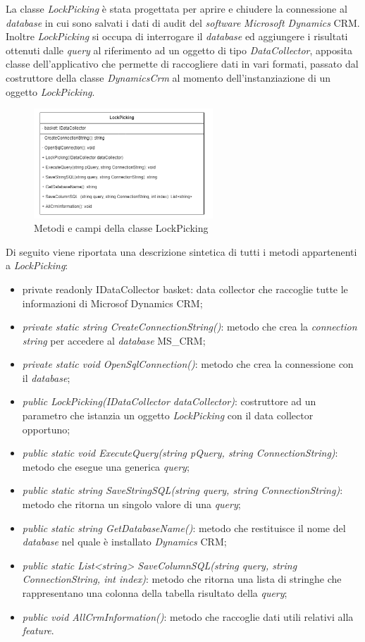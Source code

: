 La classe \emph{LockPicking} è stata progettata per aprire e chiudere la connessione al \emph{database} in cui sono salvati i dati di audit del \emph{software} \emph{Microsoft Dynamics} CRM.
Inoltre \emph{LockPicking} si occupa di interrogare il \emph{database} ed aggiungere i risultati ottenuti dalle \emph{query} al riferimento ad un oggetto di tipo \emph{DataCollector}, apposita classe dell'applicativo che permette di raccogliere dati in vari formati, passato dal costruttore della classe \emph{DynamicsCrm} al momento dell'instanziazione di un oggetto \emph{LockPicking}.
\begin{figure}[H]
\centering
\captionsetup{justification=centering,margin=2cm}
\includegraphics[width=0.6\textwidth ]{figures/lockpicking.png}
\caption [Metodi e campi della classe LockPicking]{Metodi e campi della classe LockPicking \label{fig:lockpicking}}
\end{figure}
Di seguito viene riportata una descrizione sintetica di tutti i metodi appartenenti a \emph{LockPicking}:
\begin{itemize}
    \item private readonly IDataCollector basket: data collector che raccoglie tutte le informazioni di Microsof Dynamics CRM;
    \item \textit{private static string CreateConnectionString()}: metodo che crea la \emph{connection string} per accedere al \emph{database} MS\_CRM;
    \item \textit{private static void OpenSqlConnection()}: metodo che crea la connessione con il \emph{database};
    \item \textit{public LockPicking(IDataCollector dataCollector)}: costruttore ad un parametro che istanzia un oggetto \emph{LockPicking} con il data collector opportuno;
    \item \textit{public static void ExecuteQuery(string pQuery, string ConnectionString)}: metodo che esegue una generica \emph{query};
    \item \textit{public static string SaveStringSQL(string query, string ConnectionString)}: metodo che ritorna un singolo valore di una \emph{query};
    \item \textit{public static string GetDatabaseName()}: metodo che restituisce il nome del \emph{database} nel quale è installato \emph{Dynamics} CRM;
    \item \textit{public static List<string> SaveColumnSQL(string query, string ConnectionString, int index)}: metodo che ritorna una lista di stringhe che rappresentano una colonna della tabella risultato della \emph{query};
    \item \textit{public void AllCrmInformation()}: metodo che raccoglie dati utili relativi alla \emph{feature}.
\end{itemize}
